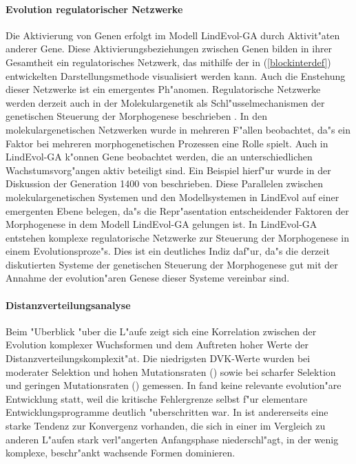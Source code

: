 \paragraph{Evolution regulatorischer Netzwerke}
Die Aktivierung von Genen erfolgt im Modell LindEvol-GA durch Aktivit"aten anderer Gene. Diese Aktivierungsbeziehungen
zwischen Genen bilden in ihrer Gesamtheit ein regulatorisches Netzwerk, das mithilfe der in (\ref{blockinterdef})
entwickelten Darstellungsmethode visualisiert werden kann. Auch die Enstehung dieser Netzwerke ist ein
emergentes Ph"anomen. Regulatorische Netzwerke werden derzeit
auch in der Molekulargenetik als Schl"usselmechanismen der genetischen Steuerung der Morphogenese beschrieben
\cite{Theissen95}. In den molekulargenetischen Netzwerken wurde in mehreren F"allen beobachtet, da"s ein
Faktor bei mehreren morphogenetischen Prozessen eine Rolle spielt. Auch in LindEvol-GA k"onnen Gene beobachtet
werden, die an unterschiedlichen Wachstumsvorg"angen aktiv beteiligt sind.
Ein Beispiel hierf"ur wurde in der Diskussion der Generation 1400 von 
beschrieben. Diese Parallelen zwischen molekulargenetischen Systemen und den Modellsystemen in LindEvol auf
einer emergenten Ebene belegen, da"s die Repr"asentation entscheidender Faktoren der Morphogenese in dem
Modell LindEvol-GA gelungen ist. In LindEvol-GA entstehen komplexe regulatorische Netzwerke zur Steuerung
der Morphogenese in einem Evolutionsproze"s. Dies ist ein deutliches Indiz daf"ur, da"s die derzeit diskutierten
Systeme der genetischen Steuerung der Morphogenese gut mit der Annahme der evolution"aren Genese dieser Systeme
vereinbar sind.


\paragraph{Distanzverteilungsanalyse}
Beim "Uberblick "uber die L"aufe zeigt sich eine Korrelation zwischen der Evolution komplexer Wuchsformen
und dem Auftreten hoher Werte der Distanzverteilungskomplexit"at.
Die niedrigsten DVK-Werte wurden bei moderater Selektion und hohen Mutationsraten ()
sowie bei scharfer Selektion und geringen Mutationsraten () gemessen. In
 fand keine relevante evolution"are Entwicklung statt, weil
die kritische Fehlergrenze selbst f"ur elementare Entwicklungsprogramme deutlich "uberschritten war.
In  ist andererseits
eine starke Tendenz zur Konvergenz vorhanden, die sich in einer im Vergleich zu anderen L"aufen stark
verl"angerten Anfangsphase niederschl"agt, in der wenig komplexe, beschr"ankt wachsende Formen dominieren.

